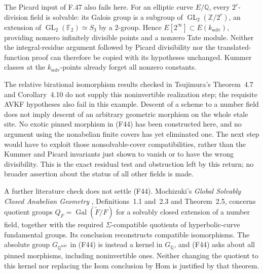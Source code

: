 The Picard input of F.47 also fails here. For an elliptic curve
$E/\mathbb Q$, every $2^r$-division field is solvable: its Galois
group is a subgroup of
$\operatorname{GL}_2(\mathbb Z/2^r)$, an extension of
$\operatorname{GL}_2(\mathbb F_2)\simeq S_3$ by a $2$-group.
Hence $E[2^\infty]\subset E(k_{\mathrm{solv}})$, providing
nonzero infinitely divisible points and a nonzero Tate module.
Neither the integral-residue argument followed by Picard
divisibility nor the translated-function proof can therefore be
copied with its hypotheses unchanged. Kummer classes at the
$k_{\mathrm{solv}}$-points already forget all nonzero constants.

The relative birational isomorphism results checked in
Tsujimura's Theorem~4.7 and Corollary~4.10 \citep{Tsujimura2022}
do not supply this noninvertible realization step; the requisite
AVKF hypotheses also fail in this example. Descent of a scheme to
a number field does not imply descent of an arbitrary geometric
morphism on the whole etale site. No exotic pinned morphism in
(F44) has been constructed here, and no argument using the
nonabelian finite covers has yet eliminated one. The next step
would have to exploit those nonsolvable-cover compatibilities,
rather than the Kummer and Picard invariants just shown to vanish
or to have the wrong divisibility. This is the exact residual
test and obstruction left by this return; no broader assertion
about the status of all other fields is made.

A further literature check does not settle (F44).
Mochizuki's \emph{Global Solvably Closed Anabelian Geometry}
\citep{Mochizuki2006SolvablyClosed}, Definitions~1.1 and~2.3 and
Theorem~2.5, concerns quotient groups
$Q_F=\operatorname{Gal}(\widetilde F/F)$ for a solvably closed
extension of a number field, together with the required
$\Sigma$-compatible quotients of hyperbolic-curve fundamental
groups. Its conclusion reconstructs compatible isomorphisms.
The absolute group $G_{\mathbb Q^{\mathrm{solv}}}$ in (F44)
is instead a kernel in $G_{\mathbb Q}$, and (F44) asks about
all pinned morphisms, including noninvertible ones. Neither
changing the quotient to this kernel nor replacing the Isom
conclusion by Hom is justified by that theorem.

